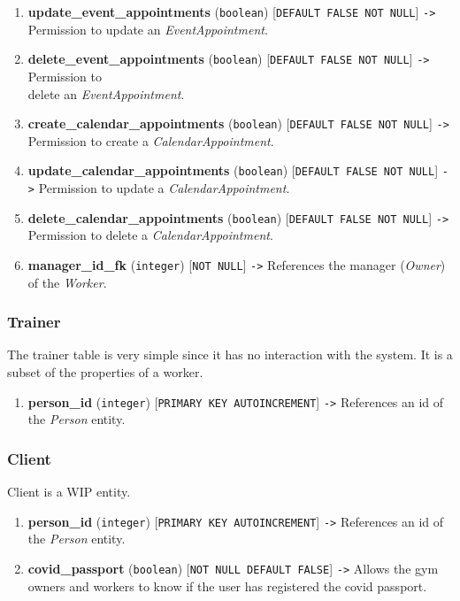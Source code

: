 \documentclass[a4paper, 12pt, oneside]{book}
\begin{document}
\begin{enumerate}[label = -]
	\item \textbf{update\_event\_appointments} (\texttt{boolean}) [\texttt{DEFAULT FALSE NOT NULL}] \texttt{->} Permission to update an \emph{EventAppointment}.
	\item \textbf{delete\_event\_appointments} (\texttt{boolean}) [\texttt{DEFAULT FALSE NOT NULL}] \texttt{->} Permission to\\delete an \emph{EventAppointment}.
	\item \textbf{create\_calendar\_appointments} (\texttt{boolean}) [\texttt{DEFAULT FALSE NOT NULL}] \texttt{->} Permission to create a \emph{CalendarAppointment}.
	\item \textbf{update\_calendar\_appointments} (\texttt{boolean}) [\texttt{DEFAULT FALSE NOT NULL}] \texttt{->} Permission to update a \emph{CalendarAppointment}.
	\item \textbf{delete\_calendar\_appointments} (\texttt{boolean}) [\texttt{DEFAULT FALSE NOT NULL}] \texttt{->} Permission to delete a \emph{CalendarAppointment}.
	\item \textbf{manager\_id\_fk} (\texttt{integer}) [\texttt{NOT NULL}] \texttt{->} References the manager (\emph{Owner}) of the \emph{Worker}.
\end{enumerate}
\subsubsection{Trainer}
The trainer table is very simple since it has no interaction with the system. It is a subset of the properties of a worker.
\begin{enumerate}[label = -]
	\item \textbf{person\_id} (\texttt{integer}) [\texttt{PRIMARY KEY AUTOINCREMENT}] \texttt{->} References an id of the \emph{Person} entity.
\end{enumerate}
\subsubsection{Client}
Client is a WIP entity.
\begin{enumerate}[label = -]
	\item \textbf{person\_id} (\texttt{integer}) [\texttt{PRIMARY KEY AUTOINCREMENT}] \texttt{->} References an id of the \emph{Person} entity.
	\item \textbf{covid\_passport} (\texttt{boolean}) [\texttt{NOT NULL DEFAULT FALSE}] \texttt{->} Allows the gym owners and workers to know if the user has registered the covid passport.
\end{enumerate}
\end{document}
